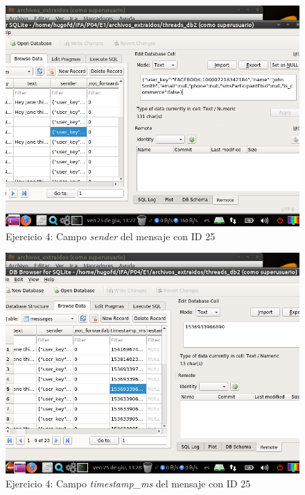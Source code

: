\documentclass[11pt]{article}
\begin{document}
\begin{figure}[H]
    \caption{Ejercicio 4: Campo \textit{sender} del mensaje con ID 25}
    \centering
    \includegraphics[scale=0.7]{e4-5.png}
\end{figure}

\begin{figure}[H]
    \caption{Ejercicio 4: Campo \textit{timestamp\_ms} del mensaje con ID 25}
    \centering
    \includegraphics[scale=0.7]{e4-6.png}
\end{figure}
\end{document}
